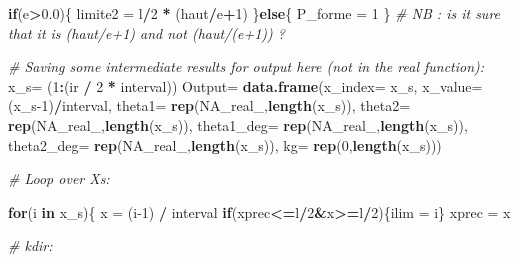 \documentclass[
]{book}
\newenvironment{Shaded}{\begin{snugshade}}{\end{snugshade}}
\newcommand{\CommentTok}[1]{\textcolor[rgb]{0.56,0.35,0.01}{\textit{#1}}}
\newcommand{\ControlFlowTok}[1]{\textcolor[rgb]{0.13,0.29,0.53}{\textbf{#1}}}
\newcommand{\DataTypeTok}[1]{\textcolor[rgb]{0.13,0.29,0.53}{#1}}
\newcommand{\DecValTok}[1]{\textcolor[rgb]{0.00,0.00,0.81}{#1}}
\newcommand{\FloatTok}[1]{\textcolor[rgb]{0.00,0.00,0.81}{#1}}
\newcommand{\KeywordTok}[1]{\textcolor[rgb]{0.13,0.29,0.53}{\textbf{#1}}}
\newcommand{\NormalTok}[1]{#1}
\newcommand{\OperatorTok}[1]{\textcolor[rgb]{0.81,0.36,0.00}{\textbf{#1}}}
\newcommand{\OtherTok}[1]{\textcolor[rgb]{0.56,0.35,0.01}{#1}}
\newcommand{\StringTok}[1]{\textcolor[rgb]{0.31,0.60,0.02}{#1}}
\begin{document}
\begin{Shaded}
\begin{Highlighting}[]
\ControlFlowTok{if}\NormalTok{(e}\OperatorTok{>}\FloatTok{0.0}\NormalTok{)\{}
\NormalTok{  limite2 =}\StringTok{ }\NormalTok{l}\OperatorTok{/}\DecValTok{2} \OperatorTok{*}\StringTok{ }\NormalTok{(haut}\OperatorTok{/}\NormalTok{e}\OperatorTok{+}\DecValTok{1}\NormalTok{)}
\NormalTok{\}}\ControlFlowTok{else}\NormalTok{\{}
\NormalTok{  P_forme =}\StringTok{ }\DecValTok{1}
\NormalTok{\}}
\CommentTok{# NB : is it sure that it is (haut/e+1) and not (haut/(e+1)) ? }

\CommentTok{# Saving some intermediate results for output here (not in the real function):}
\NormalTok{x_s=}\StringTok{ }\NormalTok{(}\DecValTok{1}\OperatorTok{:}\NormalTok{(ir }\OperatorTok{/}\StringTok{ }\DecValTok{2} \OperatorTok{*}\StringTok{ }\NormalTok{interval))}
\NormalTok{Output=}\StringTok{ }\KeywordTok{data.frame}\NormalTok{(}\DataTypeTok{x_index=}\NormalTok{ x_s,}
                   \DataTypeTok{x_value=}\NormalTok{ (x_s}\DecValTok{-1}\NormalTok{)}\OperatorTok{/}\NormalTok{interval,}
                   \DataTypeTok{theta1=} \KeywordTok{rep}\NormalTok{(}\OtherTok{NA_real_}\NormalTok{,}\KeywordTok{length}\NormalTok{(x_s)),}
                   \DataTypeTok{theta2=} \KeywordTok{rep}\NormalTok{(}\OtherTok{NA_real_}\NormalTok{,}\KeywordTok{length}\NormalTok{(x_s)),}
                   \DataTypeTok{theta1_deg=} \KeywordTok{rep}\NormalTok{(}\OtherTok{NA_real_}\NormalTok{,}\KeywordTok{length}\NormalTok{(x_s)),}
                   \DataTypeTok{theta2_deg=} \KeywordTok{rep}\NormalTok{(}\OtherTok{NA_real_}\NormalTok{,}\KeywordTok{length}\NormalTok{(x_s)),}
                   \DataTypeTok{kg=} \KeywordTok{rep}\NormalTok{(}\DecValTok{0}\NormalTok{,}\KeywordTok{length}\NormalTok{(x_s)))}

\CommentTok{# Loop over Xs:}

\ControlFlowTok{for}\NormalTok{(i }\ControlFlowTok{in}\NormalTok{ x_s)\{}
\NormalTok{  x =}\StringTok{ }\NormalTok{(i}\DecValTok{-1}\NormalTok{) }\OperatorTok{/}\StringTok{ }\NormalTok{interval}
  \ControlFlowTok{if}\NormalTok{(xprec}\OperatorTok{<=}\NormalTok{l}\OperatorTok{/}\DecValTok{2}\OperatorTok{&}\NormalTok{x}\OperatorTok{>=}\NormalTok{l}\OperatorTok{/}\DecValTok{2}\NormalTok{)\{ilim =}\StringTok{ }\NormalTok{i\}}
\NormalTok{  xprec =}\StringTok{ }\NormalTok{x}
  
  \CommentTok{# kdir:}
  

\end{Highlighting}
\end{Shaded}
\end{document}
